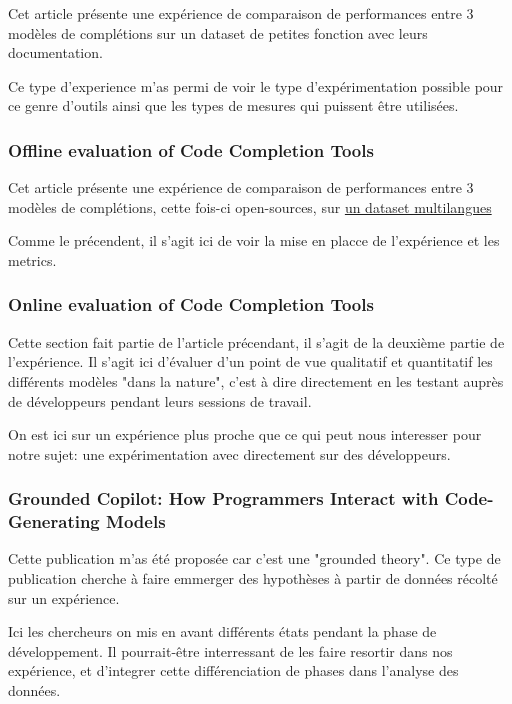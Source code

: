 Cet article présente une expérience de comparaison de performances entre
3 modèles de complétions sur un dataset de petites fonction avec leurs documentation.

Ce type d'experience m'as permi de voir le type d'expérimentation possible pour ce genre d'outils ainsi que
les types de mesures qui puissent être utilisées.


\subsubsection{Offline evaluation of Code Completion Tools \cite{llm-online-offline}}

Cet article présente une expérience de comparaison de performances entre
3 modèles de complétions, cette fois-ci open-sources, sur \href{https://github.com/VHellendoorn/Code-LMs#datasets}{un dataset multilangues}

Comme le précendent, il s'agit ici de voir la mise en placce de l'expérience et les metrics.


\subsubsection{Online evaluation of Code Completion Tools \cite{llm-online-offline}}

Cette section fait partie de l'article précendant, il s'agit de la deuxième partie de l'expérience.
Il s'agit ici d'évaluer d'un point de vue qualitatif et quantitatif les différents modèles "dans la nature",
c'est à dire directement en les testant auprès de développeurs pendant leurs sessions de travail.

On est ici sur un expérience plus proche que ce qui peut nous interesser pour notre sujet: une expérimentation avec directement sur des développeurs.


\subsubsection{Grounded Copilot: How Programmers Interact with Code-Generating Models \cite{grouded}}

Cette publication m'as été proposée car c'est une "grounded theory".
Ce type de publication cherche à faire emmerger des hypothèses à partir de données récolté sur un expérience.

Ici les chercheurs on mis en avant différents états pendant la phase de développement.
Il pourrait-être interressant de les faire resortir dans nos expérience, et d'integrer cette différenciation de phases dans l'analyse des données.


